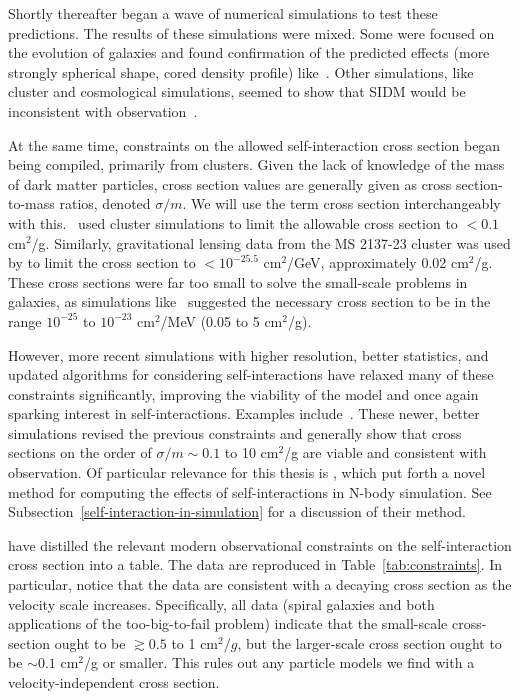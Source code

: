 Shortly thereafter began a wave of numerical simulations to test these
predictions. The results of these simulations were mixed. Some were focused on
the evolution of galaxies and found confirmation of the predicted effects
(more strongly spherical shape, cored density profile)
like~\cite{burkert_structure_2000,dave_halo_2001}. Other simulations, like
cluster and cosmological simulations, seemed to show that SIDM would be
inconsistent with
observation~\cite{moore_collisional_2000,yoshida_collisional_2000,yoshida_weakly_2000}.

At the same time, constraints on the allowed self-interaction cross section
began being compiled, primarily from clusters. Given the lack of knowledge of
the mass of dark matter particles, cross section values are generally given as
cross section-to-mass ratios, denoted $\sigma/m$. We will use the term cross
section interchangeably with this. \cite{meneghetti_giant_2001}~used cluster
simulations to limit the allowable cross section to \(< 0.1\) cm\(^2\)/g.
Similarly, gravitational lensing data from the MS 2137-23 cluster was used by
\cite{miralda-escude_test_2002} to limit the cross section to \(< 10^{-25.5}\)
cm\(^2\)/GeV, approximately 0.02 cm\(^2\)/g. These cross sections were far too
small to solve the small-scale problems in galaxies, as simulations
like~\cite{dave_halo_2001} suggested the necessary cross section to be in the
range \(10^{-25}\) to \(10^{-23}\) cm\(^2\)/MeV (0.05 to 5 cm\(^2\)/g).

However, more recent simulations with higher resolution, better statistics,
and updated algorithms for considering self-interactions have relaxed many of
these constraints significantly, improving the viability of the model and once
again sparking interest in self-interactions. Examples
include~\cite{rocha_cosmological_2013,peter_cosmological_2013,zavala_constraining_2013,elbert_core_2015}.
These newer, better simulations revised the previous constraints and generally
show that cross sections on the order of $\sigma / m \sim 0.1$ to 10
cm$^2$/g are viable and consistent with observation. Of particular relevance
for this thesis is \cite{rocha_cosmological_2013}, which put forth a novel
method for computing the effects of self-interactions in N-body simulation.
See Subsection~\ref{self-interaction-in-simulation} for a discussion of their
method.

\cite{tulin_dark_2018} have distilled the relevant modern observational
constraints on the self-interaction cross section into a table. The data are
reproduced in Table~\ref{tab:constraints}. In particular, notice that the data
are consistent with a decaying cross section as the velocity scale increases.
Specifically, all data (spiral galaxies and both applications of the
too-big-to-fail problem) indicate that the small-scale cross-section ought to
be $\gtrsim 0.5$ to 1 cm$^2/g$, but the larger-scale cross section ought to be
$\sim 0.1$ cm$^2$/g or smaller. This rules out any particle models we find
with a velocity-independent cross section.

